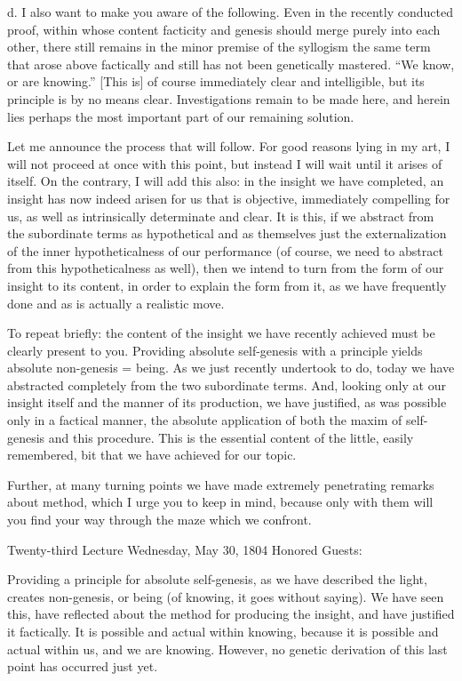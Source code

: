 d. I also want to make you aware of the following.
Even in the recently conducted proof,
within whose content facticity and genesis should merge
purely into each other,
there still remains in the minor premise of the syllogism
the same term that arose above factically
and still has not been genetically mastered.
“We know, or are knowing.”
[This is] of course immediately clear and intelligible,
but its principle is by no means clear.
Investigations remain to be made here,
and herein lies perhaps the most important
part of our remaining solution.

Let me announce the process that will follow.
For good reasons lying in my art,
I will not proceed at once with this point,
but instead I will wait until it arises of itself.
On the contrary, I will add this also:
in the insight we have completed,
an insight has now indeed arisen for us
that is objective, immediately compelling for us,
as well as intrinsically determinate and clear.
It is this, if we abstract from the subordinate terms
as hypothetical and as themselves just the externalization of
the inner hypotheticalness of our performance
(of course, we need to abstract from this hypotheticalness as well),
then we intend to turn from the form of our insight
to its content, in order to explain the form from it,
as we have frequently done and as is actually a realistic move.

To repeat briefly:
the content of the insight we have recently achieved
must be clearly present to you.
Providing absolute self-genesis with a principle
yields absolute non-genesis = being.
As we just recently undertook to do,
today we have abstracted completely
from the two subordinate terms.
And, looking only at our insight itself
and the manner of its production, we have justified,
as was possible only in a factical manner,
the absolute application of both
the maxim of self-genesis and this procedure.
This is the essential content of the little, easily remembered,
bit that we have achieved for our topic.

Further, at many turning points we have made 
extremely penetrating remarks about method,
which I urge you to keep in mind,
because only with them will you find
your way through the maze which we confront.

Twenty-third Lecture
Wednesday, May 30, 1804
Honored Guests:

Providing a principle for absolute self-genesis,
as we have described the light, creates non-genesis,
or being (of knowing, it goes without saying).
We have seen this, have reflected about
the method for producing the insight,
and have justified it factically.
It is possible and actual within knowing,
because it is possible and actual within us,
and we are knowing.
However, no genetic derivation of
this last point has occurred just yet.

